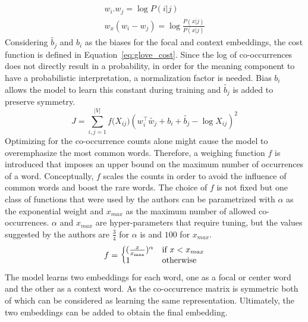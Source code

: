 \begin{equation}
\begin{split}
\\ w_{ i }.w_{ j }=\log { P(i|j)\quad  } \\
w_{ x }(w_{ i }-w_{ j })=\log { \frac { P(x|j) }{ P(x|j) } } 
\end{split}
\label{eq:log_prob}
\end{equation}
Considering $ \tilde{b_{ j }}$ and $b_{ i }$  as the biases for the focal and context embeddings, the cost function is defined in Equation~\ref{eq:glove_cost}. Since the log of co-occurrences does not directly result in a probability, in order for the meaning component to have a probabilistic interpretation, a normalization factor is needed. Bias $b_{ i }$ allows the model to learn this constant during training and $ \tilde{b_{ j }}$ is added to preserve symmetry. 
\begin{equation}
J=\sum _{ i,j=1 }^{ |V| }{ f({ X }_{ ij } } )(w_{ i }^{ \top }\tilde{  w_{ j } } +b_{ i }+\tilde{  b_{ j } } -\log{ X }_{ ij })^2
\label{eq:glove_cost}
\end{equation}
Optimizing for the co-occurrence counts alone might cause the model to overemphasize the most common words. Therefore, a weighing function $f$ is introduced that imposes an upper bound on the maximum number of occurrences of a word. Conceptually, $f$ scales the counts in order to avoid the influence of common words and boost the rare words. The choice of $f$ is not fixed but one class of functions that were used by the authors can be parametrized with $\alpha$ as the exponential weight and $x_{max}$ as the maximum number of allowed co-occurrences. $\alpha$ and $x_{max}$ are hyper-parameters that require tuning, but the values suggested by the authors are $\frac{3}{4}$ for $\alpha$ is  and $100$ for $x_{max}$. 
\begin{equation}
f=\left\{
  \begin{array}{@{}ll@{}}
    (\frac { x }{ { x }_{ \max } } )^{ \alpha  }& \text{if}\ x<x_{max} \\
    1 & \text{otherwise}
  \end{array}\right.
\label{eq:weighingfunction}
\end{equation}
\noindent
The model learns two embeddings for each word, one as a focal or center word and the other as a context word. As the co-occurrence matrix is symmetric both of which can be considered as learning the same representation. Ultimately, the two embeddings can be added to obtain the final embedding.
